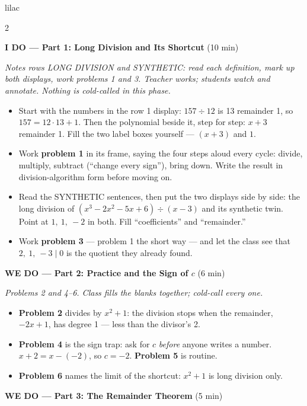 \documentclass[10pt]{article}
\begin{document}
\begin{skillbox}{lilac}
\begin{multicols}{2}

\textbf{I DO --- Part 1: Long Division and Its Shortcut} (10 min)

\textit{Notes rows LONG DIVISION and SYNTHETIC: read each definition, mark up both displays,
work problems 1 and 3. Teacher works; students watch and annotate. Nothing is cold-called in
this phase.}
\begin{itemize}
  \item Start with the numbers in the row 1 display: $157 \div 12$ is 13 remainder 1, so
        $157 = 12 \cdot 13 + 1$. Then the polynomial beside it, step for step: $x + 3$
        remainder 1. Fill the two label boxes yourself --- $(x + 3)$ and $1$.
  \item Work \textbf{problem 1} in its frame, saying the four steps aloud every cycle:
        divide, multiply, subtract (``change every sign''), bring down. Write the result in
        division-algorithm form before moving on.
  \item Read the SYNTHETIC sentences, then put the two displays side by side: the long
        division of $(x^3 - 2x^2 - 5x + 6) \div (x - 3)$ and its synthetic twin. Point at
        $1,\ 1,\ -2$ in both. Fill ``coefficients'' and ``remainder.''
  \item Work \textbf{problem 3} --- problem 1 the short way --- and let the class see that
        $2,\ 1,\ -3 \mid 0$ is the quotient they already found.
\end{itemize}

\textbf{WE DO --- Part 2: Practice and the Sign of $c$} (6 min)

\textit{Problems 2 and 4--6. Class fills the blanks together; cold-call every one.}
\begin{itemize}
  \item \textbf{Problem 2} divides by $x^2 + 1$: the division stops when the remainder,
        $-2x + 1$, has degree 1 --- less than the divisor's 2.
  \item \textbf{Problem 4} is the sign trap: ask for $c$ \emph{before} anyone writes a number.
        $x + 2 = x - (-2)$, so $c = -2$. \textbf{Problem 5} is routine.
  \item \textbf{Problem 6} names the limit of the shortcut: $x^2 + 1$ is long division only.
\end{itemize}

\textbf{WE DO --- Part 3: The Remainder Theorem} (5 min)


\end{multicols}
\end{skillbox}
\end{document}
